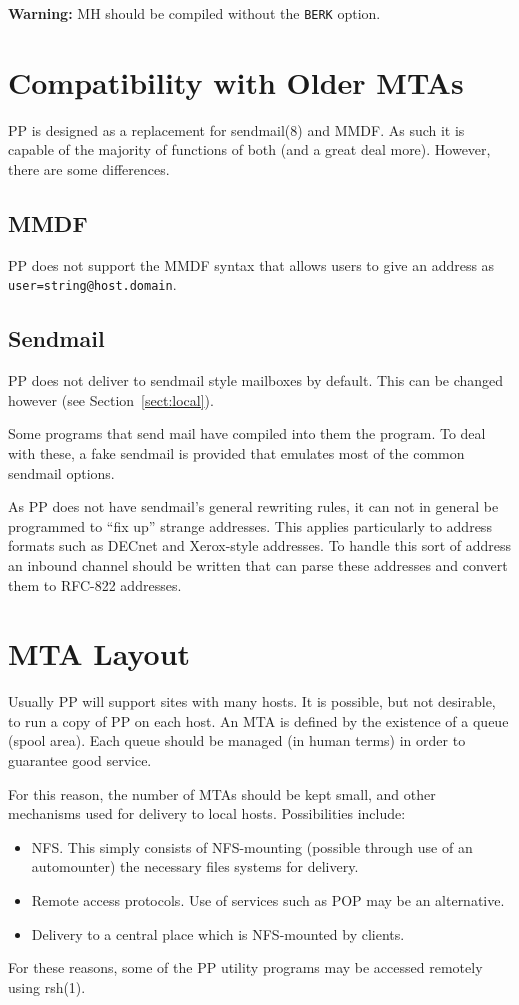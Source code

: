 {\bf Warning:} MH should be compiled without the \verb|BERK| option.

\section{Compatibility with Older MTAs}

PP is designed as a replacement for \man sendmail(8) and MMDF. As such it is
capable of the majority of functions of both (and a great deal more).
However, there are some differences.

\subsection{MMDF}
PP does not support the MMDF syntax that allows users to give an
address as \verb|user=string@host.domain|.

\subsection{Sendmail}
PP does not deliver to sendmail style mailboxes by default. This can
be changed however (see Section~\ref{sect:local}).

Some programs that send mail have compiled into them the
 program. To deal with these, a fake sendmail is
provided that emulates most of the common sendmail options.

As PP does not have sendmail's general rewriting rules, it can not in
general be programmed to ``fix up'' strange addresses. This applies
particularly to address formats such as DECnet and Xerox-style
addresses. To handle this sort of address an inbound channel should be
written that can parse these addresses and convert them to RFC-822 addresses.

\section{MTA Layout}
Usually PP will support sites with many hosts. It is possible, but
not desirable, to run a copy of PP on each host. An MTA is defined
by the existence of a queue (spool area). Each queue should be managed
(in human terms) in order to guarantee good service.

For this reason, the number of MTAs should be kept small, and other
mechanisms used for delivery to local hosts. Possibilities include:
\begin{itemize}
\item NFS. This simply consists of NFS-mounting (possible through use
of an automounter) the necessary files systems for delivery.
\item Remote access protocols. Use of services such as POP\cite{POP}
may be an alternative.
\item Delivery to a central place which is NFS-mounted by clients.
\end{itemize}
For these reasons, some of the PP utility programs may be accessed
remotely using \man rsh(1).

